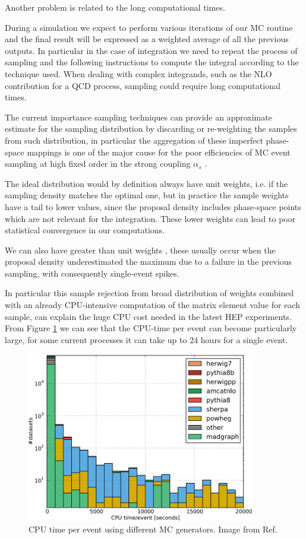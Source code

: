 \documentclass[../main/main.tex]{subfiles}
\begin{document}
Another problem is related to the long computational times.

During a simulation we expect to perform various iterations of our MC routine and the final result 
will be expressed as a weighted average of all the previous outputs.
In particular in the case of integration we need to repeat the process of sampling and the following instructions to compute the integral according to the technique used. When dealing with complex integrands, such as the NLO contribution for a QCD process, sampling could require long computational times.

The current importance sampling techniques can provide an approximate estimate for the sampling distribution by discarding or re-weighting
the samples from such distribution, in particular the aggregation of these imperfect phase-space mappings is one of the major cause for
the poor efficiencies of MC event sampling at high fixed order in the strong coupling $\alpha_s$ .

The ideal distribution would by definition always have unit weights, i.e. if the sampling density matches the optimal one, but in practice 
the sample weights have a tail to lower values, since the proposal density includes phase-space points which are not relevant for the integration.
These lower weights can lead to poor statistical convergence in our computations.

 We can also have greater than unit weights , these usually occur when the proposal density underestimated the maximum due to a failure in the
previous sampling, with consequently single-event spikes.

In particular this sample rejection from broad distribution of weights combined with an already CPU-intensive computation of the matrix element value for each sample,  can explain the huge CPU cost needed in the latest HEP experiments.  From Figure \ref{CPU-time} we can see that the CPU-time per event can become particularly large,  for some current processes it can take up to 24 hours for a single event.


\begin{figure}[]
	\centering
	\includegraphics[width = 10cm]{../images/CPU-time.png}
	\caption{CPU time per event using different MC generators. Image from Ref\cite{Buckley:2019wov}.}
	\label{CPU-time}
\end{figure}
\end{document}
